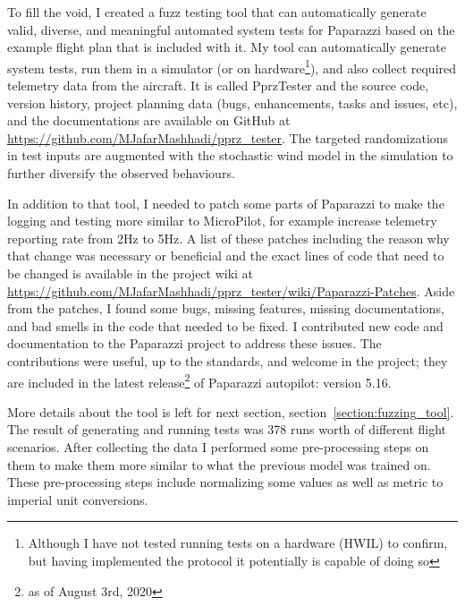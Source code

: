 To fill the void, I created a fuzz testing tool that can automatically generate valid, diverse, and meaningful automated system tests for Paparazzi based on the example flight plan that is included with it.
My tool can automatically generate system tests, run them in a simulator (or on hardware\footnote{Although I have not tested running tests on a hardware (HWIL) to confirm, but having implemented the protocol it potentially is capable of doing so}), and also collect required telemetry data from the aircraft. 
It is called PprzTester and the source code, version history, project planning data (bugs, enhancements, tasks and issues, etc), and the documentations are available on GitHub at \url{https://github.com/MJafarMashhadi/pprz_tester}. 
The targeted randomizations in test inputs are augmented with the stochastic wind model in the simulation to further diversify the observed behaviours.

In addition to that tool, I needed to patch some parts of Paparazzi to make the logging and testing more similar to MicroPilot, for example increase telemetry reporting rate from 2Hz to 5Hz. A list of these patches including the reason why that change was necessary or beneficial and the exact lines of code that need to be changed is available in the project wiki at \url{https://github.com/MJafarMashhadi/pprz_tester/wiki/Paparazzi-Patches}.
Aside from the patches, I found some bugs, missing features, missing documentations, and bad smells in the code that needed to be fixed. I contributed new code and documentation to the Paparazzi project to address these issues. The contributions were useful, up to the standards, and welcome in the project; they are included in the latest release\footnote{as of August 3rd, 2020} of Paparazzi autopilot: version 5.16.

More details about the tool is left for next section, section~\ref{section:fuzzing_tool}.
The result of generating and running tests was 378 runs worth of different flight scenarios.
After collecting the data I performed some pre-processing steps on them to make them more similar to what the previous model was trained on. These pre-processing steps include normalizing some values as well as metric to imperial unit conversions.

